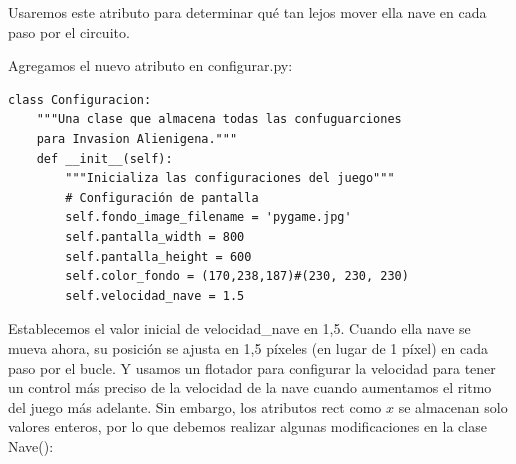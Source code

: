 Usaremos este atributo para determinar  qué tan lejos mover ella nave en cada paso por el circuito.

Agregamos el nuevo atributo en  {\ttfamily configurar.py}:

\hspace{-2.75cm}{\ttfamily \scriptsize configurar.py}  \vspace{-0.5cm}
\begin{lstlisting}
class Configuracion:
    """Una clase que almacena todas las confuguarciones 
    para Invasion Alienigena."""
    def __init__(self):
        """Inicializa las configuraciones del juego"""
        # Configuración de pantalla
        self.fondo_image_filename = 'pygame.jpg' 
        self.pantalla_width = 800
        self.pantalla_height = 600
        self.color_fondo = (170,238,187)#(230, 230, 230)
        self.velocidad_nave = 1.5
\end{lstlisting}
Establecemos el valor inicial de {\ttfamily velocidad\_nave} en 1,5. Cuando ella nave se mueva ahora, su posición se ajusta en 1,5 píxeles 
(en lugar de 1 píxel) en cada paso por el bucle. 
Y usamos un flotador para configurar la velocidad para tener un control más preciso de la velocidad de la nave cuando aumentamos
el ritmo del juego más adelante. Sin embargo, los atributos {\ttfamily rect} como $x$ se almacenan solo valores enteros,
por lo que debemos   realizar algunas modificaciones en la clase {\ttfamily Nave()}:

